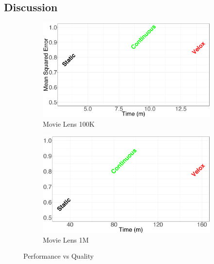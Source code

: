 \documentclass{vldb}
\begin{document}
\subsection{Discussion}
\begin{figure}[h]
\begin{subfigure}{.5\textwidth}
  \includegraphics[width=\linewidth]{../images/experiment-results/movie-lens-100k-systems.eps}
  \caption{Movie Lens 100K}
  \label{fig:sfig2}
\end{subfigure}%
\begin{subfigure}{0.5\textwidth}
  \includegraphics[width=\linewidth]{../images/experiment-results/movie-lens-1m-systems.eps}
  \caption{Movie Lens 1M}
  \label{fig:sfig1}
\end{subfigure}

\caption{Performance vs Quality}
\label{fig:fig}
\end{figure}
\end{document}
